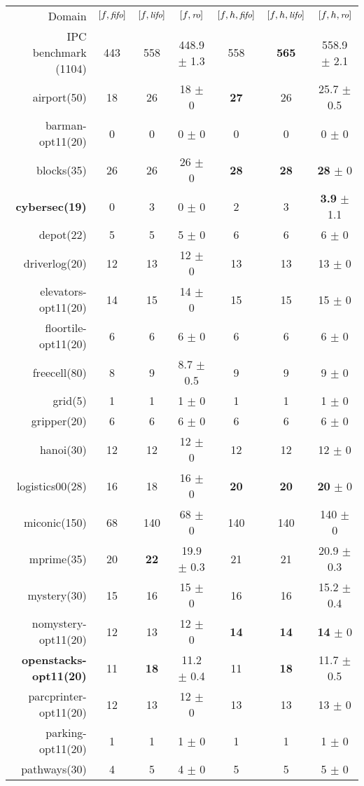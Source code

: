 \begin{center}
\begin{tabular}{|r|*{2}{ccc|}}
Domain & $[f,{\small\textit{fifo}}]$ & $[f,{\small\textit{lifo}}]$ & $[f,{\small\textit{ro}}]$ & $[f,h,{\small\textit{fifo}}]$ & $[f,h,{\small\textit{lifo}}]$ & $[f,h,{\small\textit{ro}}]$\\
IPC benchmark (1104) & 443 & 558 & 448.9 $\pm$ 1.3 & 558 & \textbf{565} & 558.9 $\pm$ 2.1\\
airport(50) & 18 & 26 & 18 $\pm$ 0 & \textbf{27} & 26 & 25.7 $\pm$ 0.5\\
barman-opt11(20) & 0 & 0 & 0 $\pm$ 0 & 0 & 0 & 0 $\pm$ 0\\
blocks(35) & 26 & 26 & 26 $\pm$ 0 & \textbf{28} & \textbf{28} & \textbf{28} $\pm$ 0\\
\textbf{cybersec(19)} & 0 & 3 & 0 $\pm$ 0 & 2 & 3 & \textbf{3.9} $\pm$ 1.1\\
depot(22) & 5 & 5 & 5 $\pm$ 0 & 6 & 6 & 6 $\pm$ 0\\
driverlog(20) & 12 & 13 & 12 $\pm$ 0 & 13 & 13 & 13 $\pm$ 0\\
elevators-opt11(20) & 14 & 15 & 14 $\pm$ 0 & 15 & 15 & 15 $\pm$ 0\\
floortile-opt11(20) & 6 & 6 & 6 $\pm$ 0 & 6 & 6 & 6 $\pm$ 0\\
freecell(80) & 8 & 9 & 8.7 $\pm$ 0.5 & 9 & 9 & 9 $\pm$ 0\\
grid(5) & 1 & 1 & 1 $\pm$ 0 & 1 & 1 & 1 $\pm$ 0\\
gripper(20) & 6 & 6 & 6 $\pm$ 0 & 6 & 6 & 6 $\pm$ 0\\
hanoi(30) & 12 & 12 & 12 $\pm$ 0 & 12 & 12 & 12 $\pm$ 0\\
logistics00(28) & 16 & 18 & 16 $\pm$ 0 & \textbf{20} & \textbf{20} & \textbf{20} $\pm$ 0\\
miconic(150) & 68 & 140 & 68 $\pm$ 0 & 140 & 140 & 140 $\pm$ 0\\
mprime(35) & 20 & \textbf{22} & 19.9 $\pm$ 0.3 & 21 & 21 & 20.9 $\pm$ 0.3\\
mystery(30) & 15 & 16 & 15 $\pm$ 0 & 16 & 16 & 15.2 $\pm$ 0.4\\
nomystery-opt11(20) & 12 & 13 & 12 $\pm$ 0 & \textbf{14} & \textbf{14} & \textbf{14} $\pm$ 0\\
\textbf{openstacks-opt11(20)} & 11 & \textbf{18} & 11.2 $\pm$ 0.4 & 11 & \textbf{18} & 11.7 $\pm$ 0.5\\
parcprinter-opt11(20) & 12 & 13 & 12 $\pm$ 0 & 13 & 13 & 13 $\pm$ 0\\
parking-opt11(20) & 1 & 1 & 1 $\pm$ 0 & 1 & 1 & 1 $\pm$ 0\\
pathways(30) & 4 & 5 & 4 $\pm$ 0 & 5 & 5 & 5 $\pm$ 0\\

\end{tabular}
\end{center}
